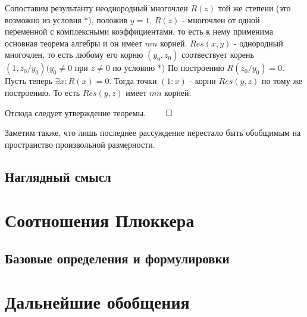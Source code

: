 \documentclass[a4paper, 12pt]{article}
\begin{document}
\bigskip
Сопоставим результанту неоднородный многочлен $R(z)$ той же степени (это возможно из условия *), положив $y=1$.
$R(z)$ - многочлен от одной переменной с комплексными коэффициентами, то есть к нему применима основная теорема алгебры и он имеет $mn$ корней.
$Res(x,y)$ - однородный многочлен, то есть любому его корню $(y_0, z_0)$ соотвествует корень $(1, z_0/y_0) (y_0 \neq 0$ при $z \neq 0$ по условию *)
По построению $R(z_0/y_0) = 0$.
Пусть теперь $\exists x: R(x) = 0$. Тогда точки $(1:x)$ - корни $Res(y,z)$ по тому же построению.
То есть $Res(y,z)$ имеет $mn$ корней.

Отсюда следует утверждение теоремы. $\qed$

Заметим также, что лишь последнее рассуждение перестало быть обобщимым на пространство произвольной размерности.

\subsection{Наглядный смысл} %

\section{Соотношения Плюккера}
\subsection{Базовые определения и формулировки}
\section{Дальнейшие обобщения}
\end{document}
